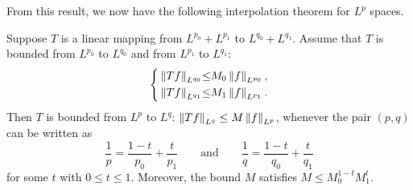 \documentclass{article}
\begin{document}
From this result, we now have the following interpolation theorem for $L^{p}$ spaces. 

\begin{theorem}
	Suppose $T$ is a linear mapping from $L^{p_{0}} + L^{p_{1}}$ to $L^{q_{0}} + L^{q_{1}}$. Assume that $T$ is bounded from $L^{p_{0}}$ to $L^{q_{0}}$ and from $L^{p_{1}}$ to $L^{q_{1}}$: 
	\begin{equation*}
		\left\{
		\begin{alignedat}{3}
			&\left\Vert Tf \right\Vert_{L^{q_{0}}} & \leq & M_{0}\left\Vert f \right\Vert_{L^{p_{0}}}, \\
			&\left\Vert Tf \right\Vert_{L^{q_{1}}} & \leq & M_{1}\left\Vert f \right\Vert_{L^{p_{1}}}. 
		\end{alignedat} 
		\right. 
	\end{equation*} 
	Then $T$ is bounded from $L^{p}$ to $L^{q}$: $\left\Vert Tf \right\Vert_{L^{q}} \leq M\left\Vert f \right\Vert_{L^{p}}$, whenever the pair $(p, q)$ can be written as 
	\begin{equation*}
		\frac{1}{p} = \frac{1 - t}{p_{0}} + \frac{t}{p_{1}} \qquad \text{and} \qquad \frac{1}{q} = \frac{1 - t}{q_{0}} + \frac{t}{q_{1}}
	\end{equation*} 
	for some $t$ with $0 \leq t \leq 1$. Moreover, the bound $M$ satisfies $M \leq M_{0}^{1 - t}M_{1}^{t}$. 
\end{theorem} 
\end{document}
